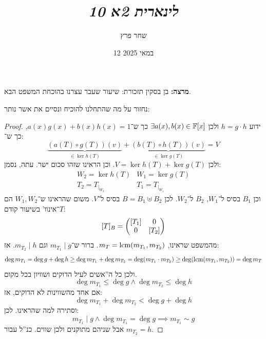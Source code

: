 \documentclass[]{../../../../tex/classes/styledArticle}
\author{שחר פרץ}
\title{\textit{לינארית 2א 10}}
\date{12 במאי 2025}
\begin{document}
    \maketitle
    \textbf{מרצה: }בן בסקין
    תזכורת: שיעור שעבר עצרנו בהוכחת המשפט הבא. 
    
    
    
    נחזור על מה שהתחלנו להוכיח ונסיים את אשר נותר: 
    \begin{proof}
        ידוע $h= g \cdot h$ ולכן $\exists a(x), b(x) \in \mathbb{F}[x]$ כך ש־$a(x)g(x) + b(x)h(x) = 1$, כך ש־: 
        \[ \underbrace{(a(T) \circ g(T))(v)}_{\in \ker h(T)} + \underbrace{(b(T) \circ h(T))(v)}_{\in \ker g(T)} = V \]
        ולכן $V = \ker h(T) + \ker g(T)$. 
        וכן הראינו שזהו סכום ישר. עתה, נסמן: 
        \begin{align*}
            W_2 = \ker h(T) & W_1 = \ker g(T) \\
            T_2 =  T_{|_{W_2}} & T_1 = T_{|_{W_1}}
        \end{align*}
        וכן $B_1$ בסיס ל־$W_1$, $B_2$ ל־$W_2$. לכן $B = B_1 \uplus B_2$ בסיס ל־$V$. משום שהראינו ש־$W_1, W_2$ הם $T$־אינוו' בשיעור קודם: 
        \[ [T]_B = \begin{pmatrix} [T_1] & 0 \\ 0 & [T_2] \end{pmatrix} \]
        מהמשפט שראינו, $m_T = \operatorname{lcm}(m_{T_1}, m_{T_2})$. ברור ש־$m_{T_1} \mid g$ וגם $m_{T_2} \mid h$. אז: 
        \[ \deg m_{T_1} = \deg g + \deg h \ge \deg m_{T_1} + \deg m_{T_2} = \deg(m_{T_1} \cdot m_{T_2}) \ge \deg(\operatorname{lcm}(m_{T_1}, m_{T_2})) = \deg m_T \]
        ולכן כל ה''אשים לעיל הדוקים ושוויון בכל מקום. 
        \[ \deg m_{T_1} \le \deg g \land \deg m_{T_2} \le \deg h \]
        אם אחד מהשווינות לא הדוקים, אז: 
        \[ \deg m_{T_1} + \deg m_{T_2} < \deg g + \deg h \]
        וסתירה למה שהראינו. לכן: 
        \[ m_{T_1} \mid g \land \deg m_{T_1} = \deg g \implies m_{T_1} \sim g \]
        אבל שניהם מתוקנים ולכן שווים. כנ''ל עבור $m_{T_2} = h$. 
    \end{proof}
    
\end{document}
